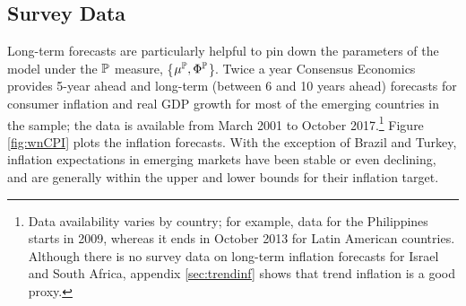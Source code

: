 {\subsection{Survey Data} \label{sec:SurveyData}
\iftoggle{toclinks}{\gototoc}{} %

Long-term forecasts are particularly helpful to pin down the parameters of the model under the \(\mathbb{P}\) measure, \{\(\mu^{\mathbb{P}}, \Phi^{\mathbb{P}}\)\}.
Twice a year Consensus Economics provides 5-year ahead and long-term (between 6 and 10 years ahead) forecasts for consumer inflation and real GDP growth for most of the emerging countries in the sample; the data is available from March 2001 to October 2017.\footnote{ Data availability varies by country; for example, data for the Philippines starts in 2009, whereas it ends in October 2013 for Latin American countries. Although there is no survey data on long-term inflation forecasts for Israel and South Africa, appendix \ref{sec:trendinf} shows that trend inflation is a good proxy.}
Figure \ref{fig:wnCPI} 
plots the inflation forecasts. %
With the exception of Brazil and Turkey, inflation expectations in emerging markets have been stable or even declining, and are generally within the upper and lower bounds for their inflation target.


}
